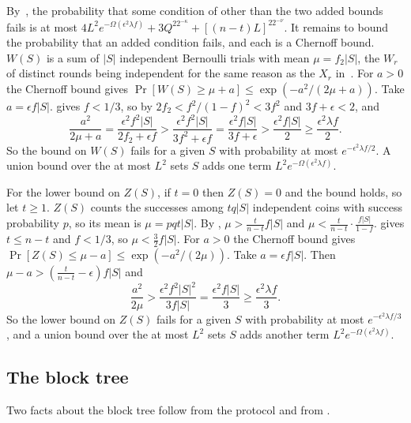 \begin{proofof}{}
    By~\cite[Theorem 4.5]{gkl24}, the probability that some condition of
     other than the two added bounds fails is at most
    $4L^2e^{-\Omega(\epsilon^2\lambda f)}+3Q^22^{-\kappa}+[(n-t)L]^22^{-\nu}$.
    It remains to bound the probability that an added condition fails, and
    each is a Chernoff bound. $W(S)$ is a sum of $|S|$ independent Bernoulli
    trials with mean $\mu=f_2|S|$, the $W_r$ of distinct rounds being
    independent for the same reason as the $X_r$ in~\cite{gkl24}. For $a>0$
    the Chernoff bound gives $\Pr[W(S)\ge\mu+a]\le\exp(-a^2/(2\mu+a))$. Take
    $a=\epsilon f|S|$.  gives $f<1/3$, so by 
    $2f_2<f^2/(1-f)^2<3f^2$ and $3f+\epsilon<2$, and
    \[
        \frac{a^2}{2\mu+a} = \frac{\epsilon^2f^2|S|}{2f_2+\epsilon f}
        > \frac{\epsilon^2f^2|S|}{3f^2+\epsilon f} = \frac{\epsilon^2f|S|}{3f+\epsilon}
        > \frac{\epsilon^2f|S|}{2} \ge \frac{\epsilon^2\lambda f}{2} .
    \]
    So the bound on $W(S)$ fails for a given $S$ with probability at most
    $e^{-\epsilon^2\lambda f/2}$. A union bound over the at most $L^2$ sets $S$
    adds one term $L^2e^{-\Omega(\epsilon^2\lambda f)}$.

    For the lower bound on $Z(S)$, if $t=0$ then $Z(S)=0$ and the bound holds,
    so let $t\ge1$. $Z(S)$ counts the successes among $tq|S|$ independent coins
    with success probability $p$, so its mean is $\mu=pqt|S|$. By
    , $\mu>\frac{t}{n-t}f|S|$ and
    $\mu<\frac{t}{n-t}\cdot\frac{f|S|}{1-f}$.  gives
    $t\le n-t$ and $f<1/3$, so $\mu<\frac{3}{2}f|S|$. For $a>0$ the Chernoff
    bound gives $\Pr[Z(S)\le\mu-a]\le\exp(-a^2/(2\mu))$. Take
    $a=\epsilon f|S|$. Then $\mu-a>\left(\frac{t}{n-t}-\epsilon\right)f|S|$
    and
    \[
        \frac{a^2}{2\mu} > \frac{\epsilon^2f^2|S|^2}{3f|S|} = \frac{\epsilon^2f|S|}{3}
        \ge \frac{\epsilon^2\lambda f}{3} .
    \]
    So the lower bound on $Z(S)$ fails for a given $S$ with probability at most
    $e^{-\epsilon^2\lambda f/3}$, and a union bound over the at most $L^2$ sets
    $S$ adds another term $L^2e^{-\Omega(\epsilon^2\lambda f)}$.
\end{proofof}

\subsection{The block tree}

Two facts about the block tree follow from the protocol and from
.

